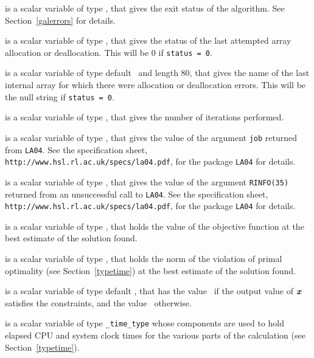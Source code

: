 \begin{description}

 is a scalar variable of type \integer, that gives the
exit status of the algorithm.
See Section~\ref{galerrors}
for details.

 is a scalar variable of type \integer, that gives
the status of the last attempted array allocation or deallocation.
This will be 0 if {\tt status = 0}.

 is a scalar variable of type default \character\
and length 80, that  gives the name of the last internal array
for which there were allocation or deallocation errors.
This will be the null string if {\tt status = 0}.

 is a scalar variable of type \integer, that
gives the number of iterations performed.

 is a scalar variable of type \integer, that
gives the value of the argument {\tt job} returned from {\tt LA04}.
See the specification sheet,
{\tt http://www.hsl.rl.ac.uk/specs/la04.pdf},
for the package {\tt LA04} for details.

 is a scalar variable of type \integer, that
gives the value of the argument {\tt RINFO(35)} returned from an
unsuccessful call to {\tt LA04}.
See the specification sheet,
{\tt http://www.hsl.rl.ac.uk/specs/la04.pdf},
for the package {\tt LA04} for details.

 is a scalar variable of type \realdp, that holds the
value of the objective function at the best estimate of the solution found.

 is a scalar variable of type \realdp,
that holds the norm of the violation of primal optimality
(see Section~\ref{typetime}) at the best estimate of the solution found.

 is a scalar variable of type default \logical, that has the
value \true\ if the output value of ${\bm{x}}$ satisfies the constraints,
and the value \false\ otherwise.

 is a scalar variable of type {\tt \packagename\_time\_type}
whose components are used to hold elapsed CPU and system clock times for the
various parts of the calculation (see Section~\ref{typetime}).

\end{description}
